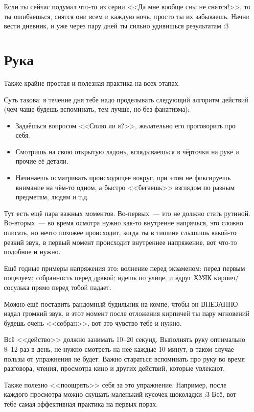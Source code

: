 \documentclass[a4paper,14pt,oneside]{memoir}
\begin{document}
Если ты сейчас подумал что-то из серии <<Да мне вообще сны не снятся!>>, то ты ошибаешься, снятся они всем и каждую ночь, просто ты их забываешь. Начни вести дневник, и уже через пару дней ты сильно удивишься результатам :3 

\section{Рука}

Также крайне простая и полезная практика на всех этапах.

Суть такова: в течение дня тебе надо проделывать следующий алгоритм действий (чем чаще будешь вспоминать, тем лучше, но без фанатизма):
\begin{itemize}
\item Задаёшься вопросом <<Сплю ли я?>>, желательно его проговорить про себя.
\item Смотришь на свою открытую ладонь, вглядываешься в чёрточки на руке и прочие её детали.
\item Начинаешь осматривать происходящее вокруг, при этом не фиксируешь внимание на чём-то одном, а быстро <<бегаешь>> взглядом по разным предметам, людям и т.д.
\end{itemize}

Тут есть ещё пара важных моментов. Во-первых~--- это не должно стать рутиной. Во-вторых~--- во время осмотра нужно как-то внутренне напрячься, это сложно описать, но нечто похожее происходит, когда ты в тишине слышишь какой-то резкий звук, в первый момент происходит внутреннее напряжение, вот что-то подобное и нужно.

Ещё годные примеры напряжения это: волнение перед экзаменом; перед первым поцелуем; собранность перед дракой; идешь по улице, и вдруг ХУЯК кирпич/сосулька прямо перед тобой падает.
 
Можно ещё поставить рандомный будильник на компе, чтобы он ВНЕЗАПНО издал громкий звук, в этот момент после отложения кирпичей ты пару мгновений будешь очень <<собран>>, вот это чувство тебе и нужно.

Всё <<действо>> должно занимать 10--20 секунд. Выполнять руку оптимально 8--12 раз в день, не нужно смотреть на неё каждые 10 минут, в таком случае пользы от упражнения не будет. Важно стараться вспоминать про руку во время разговора, чтения, просмотра кино и других действий, которые увлекают. 

Также полезно <<поощрять>> себя за это упражнение. Например, после каждого просмотра можно скушать маленький кусочек шоколадки :3
Всё, вот тебе самая эффективная практика на первых порах.
\end{document}
